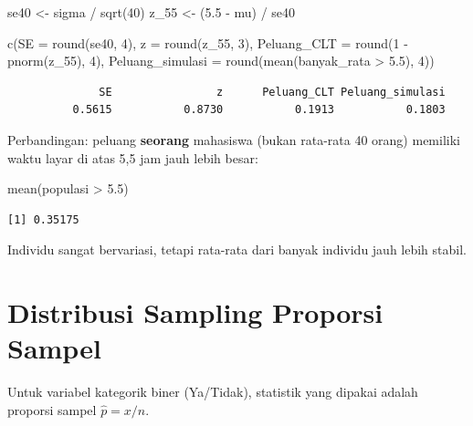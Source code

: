\documentclass[
  indonesian,
  letterpaper,
]{book}
\newenvironment{Shaded}{\begin{snugshade}}{\end{snugshade}}
\newcommand{\AttributeTok}[1]{\textcolor[rgb]{0.40,0.45,0.13}{#1}}
\newcommand{\DecValTok}[1]{\textcolor[rgb]{0.68,0.00,0.00}{#1}}
\newcommand{\FloatTok}[1]{\textcolor[rgb]{0.68,0.00,0.00}{#1}}
\newcommand{\FunctionTok}[1]{\textcolor[rgb]{0.28,0.35,0.67}{#1}}
\newcommand{\NormalTok}[1]{\textcolor[rgb]{0.00,0.23,0.31}{#1}}
\newcommand{\OtherTok}[1]{\textcolor[rgb]{0.00,0.23,0.31}{#1}}
\newcommand{\SpecialCharTok}[1]{\textcolor[rgb]{0.37,0.37,0.37}{#1}}
\begin{document}
\begin{Shaded}
\begin{Highlighting}[]
\NormalTok{se40  }\OtherTok{\textless{}{-}}\NormalTok{ sigma }\SpecialCharTok{/} \FunctionTok{sqrt}\NormalTok{(}\DecValTok{40}\NormalTok{)}
\NormalTok{z\_55  }\OtherTok{\textless{}{-}}\NormalTok{ (}\FloatTok{5.5} \SpecialCharTok{{-}}\NormalTok{ mu) }\SpecialCharTok{/}\NormalTok{ se40}

\FunctionTok{c}\NormalTok{(}\AttributeTok{SE =} \FunctionTok{round}\NormalTok{(se40, }\DecValTok{4}\NormalTok{), }\AttributeTok{z =} \FunctionTok{round}\NormalTok{(z\_55, }\DecValTok{3}\NormalTok{),}
  \AttributeTok{Peluang\_CLT      =} \FunctionTok{round}\NormalTok{(}\DecValTok{1} \SpecialCharTok{{-}} \FunctionTok{pnorm}\NormalTok{(z\_55), }\DecValTok{4}\NormalTok{),}
  \AttributeTok{Peluang\_simulasi =} \FunctionTok{round}\NormalTok{(}\FunctionTok{mean}\NormalTok{(banyak\_rata }\SpecialCharTok{\textgreater{}} \FloatTok{5.5}\NormalTok{), }\DecValTok{4}\NormalTok{))}
\end{Highlighting}
\end{Shaded}

\begin{verbatim}
              SE                z      Peluang_CLT Peluang_simulasi 
          0.5615           0.8730           0.1913           0.1803 
\end{verbatim}

Perbandingan: peluang \textbf{seorang} mahasiswa (bukan rata-rata 40
orang) memiliki waktu layar di atas 5,5 jam jauh lebih besar:

\begin{Shaded}
\begin{Highlighting}[]
\FunctionTok{mean}\NormalTok{(populasi }\SpecialCharTok{\textgreater{}} \FloatTok{5.5}\NormalTok{)}
\end{Highlighting}
\end{Shaded}

\begin{verbatim}
[1] 0.35175
\end{verbatim}

Individu sangat bervariasi, tetapi rata-rata dari banyak individu jauh
lebih stabil.

\section{Distribusi Sampling Proporsi
Sampel}\label{distribusi-sampling-proporsi-sampel}

Untuk variabel kategorik biner (Ya/Tidak), statistik yang dipakai adalah
proporsi sampel \(\hat{p} = x/n\).
\end{document}
